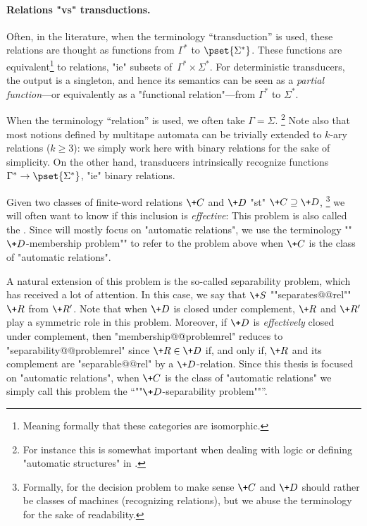 \paragraph*{Relations "vs" transductions.}
Often, in the literature, when the terminology ``transduction'' is used,
these relations are thought as functions from $\Gamma^*$ to $\pset{\Sigma^*}$.
These functions are equivalent\footnote{Meaning formally that these categories are isomorphic.}
to relations, "ie" subsets of~$\Gamma^* \times \Sigma^*$.
For deterministic transducers, the output is a singleton, and hence its semantics can be seen
as a \emph{partial function}---or equivalently as a "functional relation"---from $\Gamma^*$ to $\Sigma^*$.

When the terminology ``relation'' is used,
we often take $\Gamma = \Sigma$.%
\footnote{For instance this is somewhat important when
dealing with logic or defining "automatic structures"
in .}
Note also that most notions defined by multitape automata
can be trivially extended to $k$-ary relations ($k \geq 3$):
we simply work here with binary relations for the sake of simplicity.
On the other hand, transducers intrinsically recognize functions $\Gamma^* \to \pset{\Sigma^*}$,
"ie" binary relations.

Given two classes of finite-word relations $\+C$ and $\+D$ "st" $\+C \supseteq \+D$,%
\footnote{Formally, for the decision problem to make sense $\+C$ and $\+D$ should rather be
classes of machines (recognizing relations),
but we abuse the terminology for the sake of readability.}
we will often want to know if this inclusion is \emph{effective}:
This problem is also called the .
Since  will mostly focus on "automatic relations",
we use the terminology \AP""$\+D$-membership problem"" to refer 
to the problem above when $\+C$ is the class of "automatic relations".

A natural extension of this problem is the so-called separability problem,
which has received a lot of attention.
In this case, we say that $\+S$ ""separates@@rel"" $\+R$ from $\+R'$.
Note that when $\+D$ is closed under complement, $\+R$ and $\+R'$ play a symmetric role in this problem. Moreover, if $\+D$ is \emph{effectively} closed under complement,
then "membership@@problemrel" reduces to "separability@@problemrel" 
since $\+R \in \+D$ if, and only if, $\+R$ and its complement are "separable@@rel" by
a $\+D$-relation.
Since this thesis is focused on "automatic relations",
when $\+C$ is the class of "automatic relations" we simply call this problem
the \AP``""$\+D$-separability problem""''.

